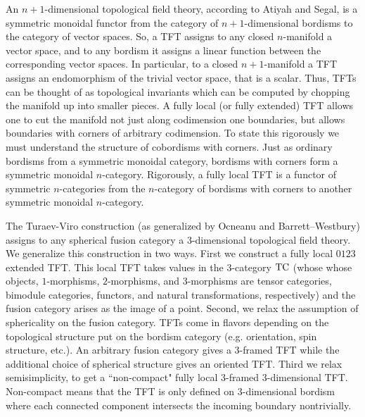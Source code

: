 \documentclass{amsart}
\begin{document}


An $n+1$-dimensional topological field theory, according to Atiyah and Segal, is a symmetric monoidal functor from the category of $n+1$-dimensional bordisms to the category of vector spaces.  So, a TFT assigns to any closed $n$-manifold a vector space, and to any bordism it assigns a linear function between the corresponding vector spaces.  In particular, to a closed $n+1$-manifold a TFT assigns an endomorphism of the trivial vector space, that is a scalar.  Thus, TFTs can be thought of as topological invariants which can be computed by chopping the manifold up into smaller pieces.  A fully local (or fully extended) TFT allows one to cut the manifold not just along codimension one boundaries, but allows boundaries with corners of arbitrary codimension.  To state this rigorously we must understand the structure of cobordisms with corners.  Just as ordinary bordisms from a symmetric monoidal category, bordisms with corners  form a symmetric monoidal $n$-category.  Rigorously, a fully local TFT is a functor of symmetric $n$-categories from the $n$-category of bordisms with corners to another symmetric monoidal $n$-category.  

The Turaev-Viro construction (as generalized by Ocneanu and Barrett--Westbury) assigns to any spherical fusion category a 3-dimensional topological field theory.  We generalize this construction in two ways.  First we construct a fully local $0123$ extended TFT.  This local TFT takes values in the $3$-category $\mathrm{TC}$ (whose whose objects, $1$-morphisms, $2$-morphisms, and $3$-morphisms are tensor categories, bimodule categories, functors, and natural transformations, respectively) and the fusion category arises as the image of a point.  Second, we relax the assumption of sphericality on the fusion category.  TFTs come in flavors depending on the topological structure put on the bordism category (e.g. orientation, spin structure, etc.).  An arbitrary fusion category gives a $3$-framed TFT while the additional choice of spherical structure gives an oriented TFT.  Third we relax semisimplicity, to get a ``non-compact" fully local $3$-framed $3$-dimensional TFT.  Non-compact means that the TFT is only defined on $3$-dimensional bordism where each connected component intersects the incoming boundary nontrivially.
\end{document}
